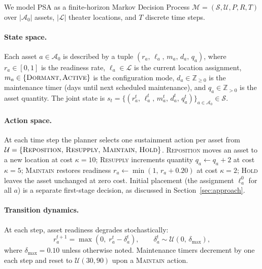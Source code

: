 \documentclass[11pt]{article}
\begin{document}
We model PSA as a finite-horizon Markov Decision Process
$\mathcal{M} = (\mathcal{S}, \mathcal{U}, P, R, T)$ over
$|\mathcal{A}_0|$ assets, $|\mathcal{L}|$ theater locations,
and $T$ discrete time steps.

\paragraph{State space.}
Each asset $a \in \mathcal{A}_0$ is described by a tuple
$(r_a,\, \ell_a,\, m_a,\, d_a,\, q_a)$, where
$r_a \in [0,1]$ is the readiness rate,
$\ell_a \in \mathcal{L}$ is the current location assignment,
$m_a \in \{\textsc{Dormant}, \textsc{Active}\}$ is the configuration mode,
$d_a \in \mathbb{Z}_{\geq 0}$ is the maintenance timer (days until next
scheduled maintenance), and $q_a \in \mathbb{Z}_{>0}$ is the asset
quantity. The joint state is
$s_t = \{(r_a^t,\, \ell_a^t,\, m_a^t,\, d_a^t,\, q_a^t)\}_{a \in
\mathcal{A}_0} \in \mathcal{S}$.

\paragraph{Action space.}
At each time step the planner selects one sustainment action per asset
from $\mathcal{U} = \{\textsc{Reposition},\, \textsc{Resupply},\,
\textsc{Maintain},\, \textsc{Hold}\}$.
\textsc{Reposition} moves an asset to a new location at cost
$\kappa = 10$; \textsc{Resupply} increments quantity
$q_a \leftarrow q_a + 2$ at cost $\kappa = 5$;
\textsc{Maintain} restores readiness
$r_a \leftarrow \min(1,\, r_a + 0.20)$ at cost $\kappa = 2$;
\textsc{Hold} leaves the asset unchanged at zero cost.
Initial placement (the assignment $\ell_a^0$ for all $a$) is a
separate first-stage decision, as discussed in
Section~\ref{sec:approach}.

\paragraph{Transition dynamics.}
At each step, asset readiness degrades stochastically:
\begin{equation}
    r_a^{t+1} = \max\!\left(0,\; r_a^t - \delta_a^t\right),
    \qquad \delta_a^t \sim \mathcal{U}(0,\, \delta_{\max}),
    \label{eq:transition}
\end{equation}
where $\delta_{\max} = 0.10$ unless otherwise noted. Maintenance timers
decrement by one each step and reset to $\mathcal{U}(30, 90)$ upon a
\textsc{Maintain} action.
\end{document}
